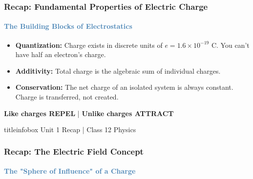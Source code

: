 \begin{frame}
\begin{frame}
\frametitle{\textsf{\textbf{Recap: Fundamental Properties of Electric Charge}}}
\framesubtitle{\textcolor{steelblue}{The Building Blocks of Electrostatics}}

\vspace{-0.05cm}

\begin{formulabox}
\vspace{0.1cm}
\begin{itemize}
    \item \textbf{Quantization:} Charge exists in discrete units of $e = 1.6 \times 10^{-19}$ C. You can't have half an electron's charge.
    \item \textbf{Additivity:} Total charge is the algebraic sum of individual charges.
    \item \textbf{Conservation:} The net charge of an isolated system is always constant. Charge is transferred, not created.
\end{itemize}
\vspace{0.1cm}
\end{formulabox}

\vspace{0.5cm}

\begin{keybox}
\vspace{0.2cm}
\centering
\Large
\textbf{\textcolor{importantRed}{Like charges REPEL}} \quad | \quad \textbf{\textcolor{familiarGreen}{Unlike charges ATTRACT}}
\vspace{0.2cm}
\end{keybox}

\vfill

\begin{beamercolorbox}[wd=\textwidth,ht=0.5cm,dp=0.1cm,center]{titleinfobox}
    \small\color{coolgray} Unit 1 Recap | Class 12 Physics
\end{beamercolorbox}
\end{frame}

\begin{frame}
\frametitle{\textsf{\textbf{Recap: The Electric Field Concept}}}
\framesubtitle{\textcolor{steelblue}{The "Sphere of Influence" of a Charge}}


\end{frame}
\end{frame}
